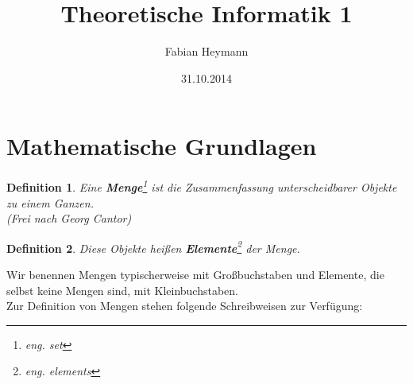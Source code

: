 \documentclass[12pt,german,a4]{article}
\begin{document}
\setlength{\parindent}{0pt}

\def\firstcircle{(0,0) circle (1.5cm)}
\def\smallfirstcircle{(0,0) circle (1cm)}
\def\secondcircle{(0:1cm) circle (1.5cm)}
\def\outercircle{(0:0) circle (2cm)}
\def\smallcircle{(135:2cm) circle (0.5cm)}
\def\smallA{(180:1.5cm) circle (0.5cm)}
\def\smallB{(0:2.5cm) circle (0.5cm)}

\title{Theoretische Informatik 1}
\author{Fabian Heymann}
\date{31.10.2014}
\maketitle

\section{Mathematische Grundlagen}

\newtheorem{defSet}{Definition}
\begin{defSet}
Eine {\bf Menge}\footnote{eng. set} ist die Zusammenfassung unterscheidbarer Objekte zu einem Ganzen.\\
(Frei nach Georg Cantor)
\end{defSet}

\newtheorem{defEle}[defSet]{Definition}
\begin{defEle}
Diese Objekte heißen {\bf Elemente}\footnote{eng. elements} der Menge.
\end{defEle}

Wir benennen Mengen typischerweise mit Großbuchstaben und Elemente, die selbst keine Mengen sind, mit Kleinbuchstaben.\\
Zur Definition von Mengen stehen folgende Schreibweisen zur Verfügung:
\end{document}
